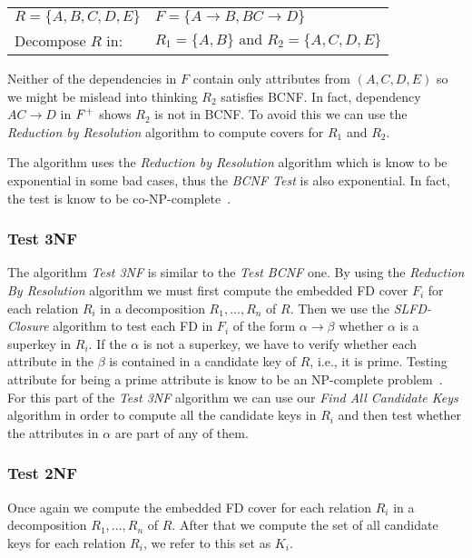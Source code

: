\begin{center}
\begin{tabular}[h]{l l}
  $R = \{A, B, C, D, E\}$ & $F = \{A \rightarrow B, BC \rightarrow D\}$ \\
  Decompose $R$ in:  & $R_1 = \{A, B\} \mbox{ and } R_2 = \{A, C, D, E\}$ \\ 
\end{tabular}
\end{center}

Neither of the dependencies in $F$ contain only attributes from
$(A,C,D,E)$ so we might be mislead into thinking $R_2$ satisfies BCNF. In fact, 
dependency $AC \rightarrow D$ in $F\sp{+}$ shows $R_2$ is not in BCNF. To avoid this we can
use the \textit{Reduction by Resolution} algorithm to compute covers for $R_1$ and $R_2$. 

The algorithm uses the \textit{Reduction by Resolution} algorithm which is know to be exponential
in some bad cases, thus the \textit{BCNF Test} is also exponential. In fact, the test is know to 
be co-NP-complete~\cite{p4}.

\subsubsection{Test 3NF}
The algorithm \textit{Test 3NF} is similar to the \textit{Test BCNF} one. 
By using the \textit{Reduction By Resolution} algorithm
we must first compute the
embedded FD cover $F_i$ for each relation $R_i$ in a decomposition $R_1,...,R_n$ of $R$. Then we use 
the \textit{SLFD-Closure} algorithm to test each FD in $F_i$ of the form $\alpha \rightarrow \beta$ 
whether $\alpha$ is a superkey in $R_i$. 
If the $\alpha$ is not a superkey, we have to verify whether each attribute in the $\beta$ 
is contained in a candidate key of $R$, i.e., it is prime. Testing attribute for being a prime
attribute is know to be an NP-complete problem~\cite{p3}. For this part of the \textit{Test 3NF} algorithm
we can use our \textit{Find All Candidate Keys} algorithm in order
to compute all the candidate keys in $R_i$ and then test whether the attributes in $\alpha$ are part of any 
of them.

\subsubsection{Test 2NF}
Once again we compute the
embedded FD cover for each relation $R_i$ in a decomposition $R_1,...,R_n$ of $R$. After that 
we compute the set of all candidate keys for each relation $R_i$, we refer to this set as $K_i$.
 
